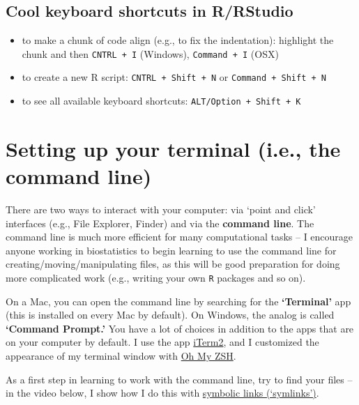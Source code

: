 \documentclass[
]{book}
\begin{document}
\hypertarget{cool-keyboard-shortcuts-in-rrstudio}{%
\subsection{Cool keyboard shortcuts in R/RStudio}\label{cool-keyboard-shortcuts-in-rrstudio}}

\begin{itemize}
\item
  to make a chunk of code align (e.g., to fix the indentation): highlight the chunk and then \texttt{CNTRL\ +\ I} (Windows), \texttt{Command\ +\ I} (OSX)
\item
  to create a new R script: \texttt{CNTRL\ +\ Shift\ +\ N} or \texttt{Command\ +\ Shift\ +\ N}
\item
  to see all available keyboard shortcuts: \texttt{ALT/Option\ +\ Shift\ +\ K}
\end{itemize}

\hypertarget{setting-up-your-terminal-i.e.-the-command-line}{%
\section{Setting up your terminal (i.e., the command line)}\label{setting-up-your-terminal-i.e.-the-command-line}}

There are two ways to interact with your computer: via `point and click' interfaces (e.g., File Explorer, Finder) and via the \textbf{command line}. The command line is much more efficient for many computational tasks -- I encourage anyone working in biostatistics to begin learning to use the command line for creating/moving/manipulating files, as this will be good preparation for doing more complicated work (e.g., writing your own \texttt{R} packages and so on).

On a Mac, you can open the command line by searching for the \textbf{`Terminal'} app (this is installed on every Mac by default). On Windows, the analog is called \textbf{`Command Prompt.'} You have a lot of choices in addition to the apps that are on your computer by default. I use the app \href{https://iterm2.com/}{iTerm2}, and I customized the appearance of my terminal window with \href{https://ohmyz.sh/}{Oh My ZSH}.

As a first step in learning to work with the command line, try to find your files -- in the video below, I show how I do this with \href{https://www.freecodecamp.org/news/linux-ln-how-to-create-a-symbolic-link-in-linux-example-bash-command/}{symbolic links (`symlinks')}.
\end{document}
